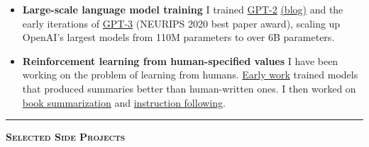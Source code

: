 \documentclass[11 pt]{article}
\begin{document}
\begin{itemize}

\item \textbf{Large-scale language model training}
  I trained \href{https://d4mucfpksywv.cloudfront.net/better-language-models/language_models_are_unsupervised_multitask_learners.pdf}{GPT-2} \href{https://openai.com/blog/better-language-models/}{(blog)} and the early iterations of \href{https://arxiv.org/pdf/2005.14165.pdf}{GPT-3} (NEURIPS 2020 best paper award), scaling up OpenAI's largest models from 110M parameters to over 6B parameters.  %

\item \textbf{Reinforcement learning from human-specified values}
I have been working on the problem of learning from humans. \href{https://openai.com/blog/learning-to-summarize-with-human-feedback/}{Early work} trained models that produced summaries better than human-written ones.  I then worked on \href{https://openai.com/blog/summarizing-books/}{book summarization} and \href{https://openai.com/blog/instruction-following/}{instruction following}.


\end{itemize}
\hrule

\begin{center}\begin{Large}\textsc{\textbf{Selected Side Projects}\\}\end{Large}\end{center}
\end{document}

